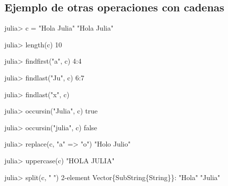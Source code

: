 \documentclass[
  letterpaper,
  DIV=11,
  numbers=noendperiod]{scrreprt}
\newenvironment{Shaded}{\begin{snugshade}}{\end{snugshade}}
\newcommand{\ConstantTok}[1]{\textcolor[rgb]{0.56,0.35,0.01}{#1}}
\newcommand{\DataTypeTok}[1]{\textcolor[rgb]{0.68,0.00,0.00}{#1}}
\newcommand{\FloatTok}[1]{\textcolor[rgb]{0.68,0.00,0.00}{#1}}
\newcommand{\FunctionTok}[1]{\textcolor[rgb]{0.28,0.35,0.67}{#1}}
\newcommand{\NormalTok}[1]{\textcolor[rgb]{0.00,0.23,0.31}{#1}}
\newcommand{\OperatorTok}[1]{\textcolor[rgb]{0.37,0.37,0.37}{#1}}
\newcommand{\StringTok}[1]{\textcolor[rgb]{0.13,0.47,0.30}{#1}}
\begin{document}
\hypertarget{ejemplo-de-otras-operaciones-con-cadenas}{%
\subsection{Ejemplo de otras operaciones con
cadenas}\label{ejemplo-de-otras-operaciones-con-cadenas}}

\begin{Shaded}
\begin{Highlighting}[]
\NormalTok{julia}\OperatorTok{\textgreater{}}\NormalTok{ c }\OperatorTok{=} \StringTok{"Hola Julia"}
\StringTok{"Hola Julia"}

\NormalTok{julia}\OperatorTok{\textgreater{}} \FunctionTok{length}\NormalTok{(c)}
\FloatTok{10}

\NormalTok{julia}\OperatorTok{\textgreater{}} \FunctionTok{findfirst}\NormalTok{(}\StringTok{"a"}\NormalTok{, c) }
\FloatTok{4}\OperatorTok{:}\FloatTok{4}

\NormalTok{julia}\OperatorTok{\textgreater{}} \FunctionTok{findlast}\NormalTok{(}\StringTok{"Ju"}\NormalTok{, c)}
\FloatTok{6}\OperatorTok{:}\FloatTok{7}

\NormalTok{julia}\OperatorTok{\textgreater{}} \FunctionTok{findlast}\NormalTok{(}\StringTok{"x"}\NormalTok{, c)}

\NormalTok{julia}\OperatorTok{\textgreater{}} \FunctionTok{occursin}\NormalTok{(}\StringTok{"Julia"}\NormalTok{, c)}
\ConstantTok{true}

\NormalTok{julia}\OperatorTok{\textgreater{}} \FunctionTok{occursin}\NormalTok{(}\StringTok{"julia"}\NormalTok{, c)}
\ConstantTok{false}

\NormalTok{julia}\OperatorTok{\textgreater{}} \FunctionTok{replace}\NormalTok{(c, }\StringTok{"a"} \OperatorTok{=\textgreater{}} \StringTok{"o"}\NormalTok{)}
\StringTok{"Holo Julio"}

\NormalTok{julia}\OperatorTok{\textgreater{}} \FunctionTok{uppercase}\NormalTok{(c)}
\StringTok{"HOLA JULIA"}

\NormalTok{julia}\OperatorTok{\textgreater{}} \FunctionTok{split}\NormalTok{(c, }\StringTok{" "}\NormalTok{)}
\FloatTok{2}\OperatorTok{{-}}\NormalTok{element }\DataTypeTok{Vector}\NormalTok{\{}\DataTypeTok{SubString}\NormalTok{\{}\DataTypeTok{String}\NormalTok{\}\}}\OperatorTok{:}
 \StringTok{"Hola"}
 \StringTok{"Julia"}
\end{Highlighting}
\end{Shaded}

\end{document}
